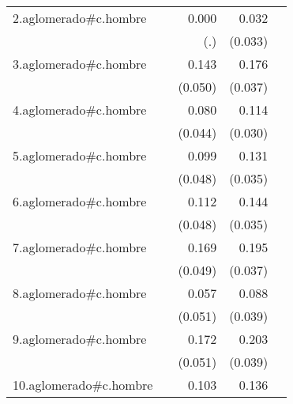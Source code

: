 {\begin{longtable}{l*{4}{D{.}{.}{-1}}}
\addlinespace
2.aglomerado#c.hombre&                     &       0.000         &       0.032         &                     \\
            &                     &         (.)         &     (0.033)         &                     \\
\addlinespace
3.aglomerado#c.hombre&                     &       0.143\sym{**} &       0.176\sym{***}&                     \\
            &                     &     (0.050)         &     (0.037)         &                     \\
\addlinespace
4.aglomerado#c.hombre&                     &       0.080         &       0.114\sym{***}&                     \\
            &                     &     (0.044)         &     (0.030)         &                     \\
\addlinespace
5.aglomerado#c.hombre&                     &       0.099\sym{*}  &       0.131\sym{***}&                     \\
            &                     &     (0.048)         &     (0.035)         &                     \\
\addlinespace
6.aglomerado#c.hombre&                     &       0.112\sym{*}  &       0.144\sym{***}&                     \\
            &                     &     (0.048)         &     (0.035)         &                     \\
\addlinespace
7.aglomerado#c.hombre&                     &       0.169\sym{***}&       0.195\sym{***}&                     \\
            &                     &     (0.049)         &     (0.037)         &                     \\
\addlinespace
8.aglomerado#c.hombre&                     &       0.057         &       0.088\sym{*}  &                     \\
            &                     &     (0.051)         &     (0.039)         &                     \\
\addlinespace
9.aglomerado#c.hombre&                     &       0.172\sym{***}&       0.203\sym{***}&                     \\
            &                     &     (0.051)         &     (0.039)         &                     \\
\addlinespace
10.aglomerado#c.hombre&                     &       0.103\sym{*}  &       0.136\sym{***}&                     \\

\end{longtable}}
